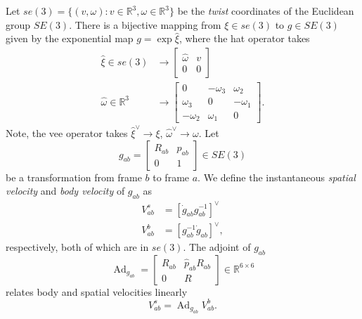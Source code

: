 \documentclass[conference]{IEEEtran}
\DeclareMathOperator{\adjoint}{Ad}
\begin{document}

Let $se(3) = \{(v,\omega): v \in \mathbb{R}^3, \omega \in \mathbb{R}^3\}$ be the
\textit{twist} coordinates of the Euclidean group $SE(3)$. There is a bijective
mapping from $\xi \in se(3)$ to $g \in SE(3)$ given by the exponential map
$ g = \exp\hat{\xi}$, where the hat operator takes 
\begin{align}
\hat{\xi} \in se(3) &\rightarrow \begin{bmatrix}\hat{\omega} & v \\ 0 & 0 \end{bmatrix}\\
\hat{\omega} \in \mathbb{R}^3 &\rightarrow 
\begin{bmatrix}
    0 & -\omega_3 & \omega_2\\
    \omega_3 & 0 & -\omega_1\\
    -\omega_2 & \omega_1 & 0
\end{bmatrix}.
\end{align}
Note, the vee operator takes $\hat{\xi}^\vee \rightarrow \xi$,
$\hat{\omega}^\vee \rightarrow \omega$. Let 
\begin{equation}
    g_{ab} = \begin{bmatrix} R_{ab} & p_{ab} \\ 0 & 1 \end{bmatrix} \in SE(3)
\end{equation}
be a transformation from frame $b$ to frame $a$. We define the instantaneous
\textit{spatial velocity} and \textit{body velocity} of $g_{ab}$ as 
\begin{align}
    V^s_{ab} &= \left[\dot{g}_{ab}g_{ab}^{-1}\right]^\vee\\
    V^b_{ab} &= \left[g_{ab}^{-1}\dot{g}_{ab}\right]^\vee,
\end{align}
respectively, both of which are in $se(3)$. The adjoint of $g_{ab}$
\begin{equation}
\adjoint_{g_{ab}} = \begin{bmatrix}R_{ab} & \hat{p}_{ab}R_{ab} \\ 0 & R \end{bmatrix} \in \mathbb{R}^{6\times 6}
\end{equation}
relates body and spatial velocities linearly
\begin{equation}
    V^s_{ab} = \adjoint_{g_{ab}}V^b_{ab}.
\end{equation}
\end{document}
